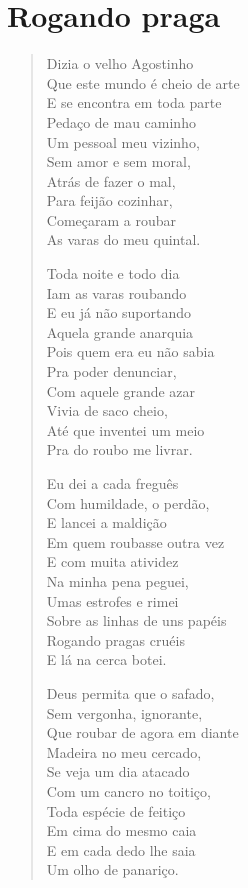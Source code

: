 \chapter{Rogando praga}

\begin{verse}
Dizia o velho Agostinho\\
Que este mundo é cheio de arte\\
E se encontra em toda parte\\
Pedaço de mau caminho\\
Um pessoal meu vizinho,\\
Sem amor e sem moral,\\
Atrás de fazer o mal,\\
Para feijão cozinhar,\\
Começaram a roubar\\
As varas do meu quintal.

Toda noite e todo dia\\
Iam as varas roubando\\
E eu já não suportando\\
Aquela grande anarquia\\
Pois quem era eu não sabia\\
Pra poder denunciar,\\
Com aquele grande azar\\
Vivia de saco cheio,\\
Até que inventei um meio\\
Pra do roubo me livrar.

Eu dei a cada freguês\\
Com humildade, o perdão,\\
E lancei a maldição\\
Em quem roubasse outra vez\\
E com muita atividez\\
Na minha pena peguei,\\
Umas estrofes e rimei\\
Sobre as linhas de uns papéis\\
Rogando pragas cruéis\\
E lá na cerca botei.

Deus permita que o safado,\\
Sem vergonha, ignorante,\\
Que roubar de agora em diante\\
Madeira no meu cercado,\\
Se veja um dia atacado\\
Com um cancro no toitiço,\\
Toda espécie de feitiço\\
Em cima do mesmo caia\\
E em cada dedo lhe saia\\
Um olho de panariço.


\end{verse}
